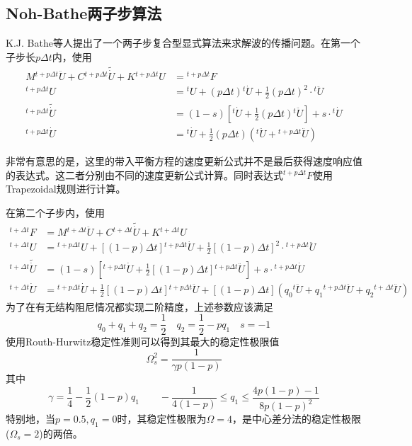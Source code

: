 \subsection{Noh-Bathe两子步算法}
K.J. Bathe等人\cite{Noh2013c}提出了一个两子步复合型显式算法来求解波的传播问题。在第一个子步长$p\Delta t$内，使用
\begin{align}
M{^{t+p\Delta t}\!\ddot{U}}+C{^{t+p\Delta t}\!\tilde{\dot{U}}}+K{^{t+p\Delta t}\!{U}}&={^{t+p\Delta t}\!F}\\
{^{t+p\Delta t}\!U}&={^t\!U}+(p\Delta t){^t\!\dot{U}}+\frac{1}{2}(p\Delta t)^2\cdot{^t\!\ddot{U}}\\
{^{t+p\Delta t}\!\tilde{\dot{U}}}&=(1-s)[{^t\!\dot{U}}+\frac{1}{2}(p\Delta t){^t\!\ddot{U}}]+s\cdot{^t\!\dot{U}}\\
{^{t+p\Delta t}\!\dot{U}}&={^t\!\dot{U}}+\frac{1}{2}(p\Delta t)({^t\!\ddot{U}}+{^{t+p\Delta t}\!\ddot{U}})
\end{align}

非常有意思的是，这里的带入平衡方程的速度更新公式并不是最后获得速度响应值的表达式。这二者分别由不同的速度更新公式计算。同时表达式${^{t+p\Delta t}\!F}$使用Trapezoidal规则\cite{Erlicher2002a}进行计算。

在第二个子步内，使用
\begin{align}
{^{t+\Delta t}\!F}&=M{^{t+\Delta t}\!\ddot{U}}+C{^{t+\Delta t}\!\tilde{\dot{U}}}+K{^{t+\Delta t}\!{U}}\\
{^{t+\Delta t}\!U}&={^{t+p\Delta t}\!U}+[(1-p)\Delta t]{^{t+p\Delta t}\!\dot{U}}+\frac{1}{2}[(1-p)\Delta t]^2\cdot{^{t+p\Delta t}\!\ddot{U}}\\
{^{t+\Delta t}\!\tilde{\dot{U}}}&=(1-s)[{^{t+p\Delta t}\!\dot{U}}+\frac{1}{2}[(1-p)\Delta t]{^{t+p\Delta t}\!\ddot{U}}]+s\cdot{^{t+p\Delta t}\!\dot{U}}\\
{^{t+\Delta t}\!\dot{U}}&={^{t+p\Delta t}\!\dot{U}}+\frac{1}{2}[(1-p)\Delta t]{^{t+p\Delta t}\!\ddot{U}}+[(1-p)\Delta t]\left(q_0{^t\!\ddot{U}}+q_1{^{t+p\Delta t}\!\ddot{U}}+q_2{^{t+\Delta t}\!\ddot{U}}\right)
\end{align}
为了在有无结构阻尼情况都实现二阶精度，上述参数应该满足
\begin{equation}
q_0+q_1+q_2=\frac{1}{2}\quad q_2=\frac{1}{2}-pq_1\quad s=-1
\end{equation}
使用Routh-Hurwitz稳定性准则\cite{Hughes2000c}可以得到其最大的稳定性极限值
\begin{equation}
\Omega_s^2=\frac{1}{\gamma p(1-p)}
\end{equation}
其中
\begin{equation}
\gamma = \frac{1}{4}-\frac12(1-p)q_1\qquad -\frac{1}{4(1-p)}\le q_1\le\frac{4p(1-p)-1}{8p(1-p)^2}\label{eq:Noh17}
\end{equation}
特别地，当$p=0.5,q_1=0$时，其稳定性极限为$\Omega=4$，是中心差分法\cite{Hughes2000c}的稳定性极限($\Omega_s=2$)的两倍。

